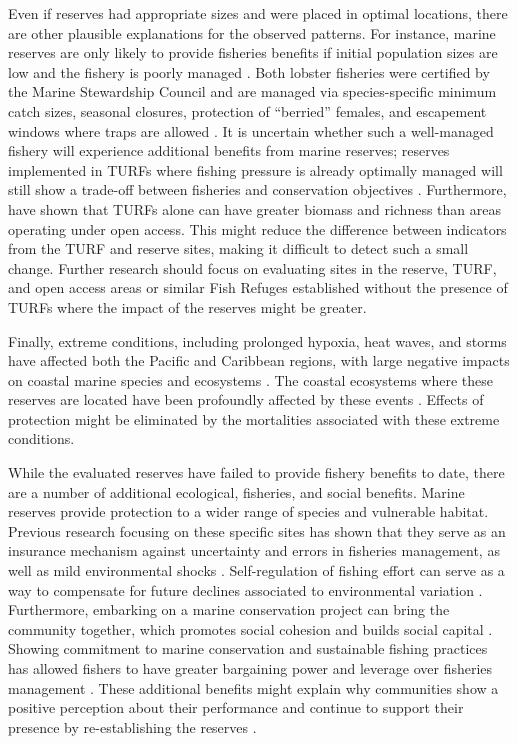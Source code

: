 \documentclass{frontiersSCNS}
\begin{document}
Even if reserves had appropriate sizes and were placed in optimal locations, there are other plausible explanations for the observed patterns. For instance, marine reserves are only likely to provide fisheries benefits if initial population sizes are low and the fishery is poorly managed \citep{hilborn_2004,hilborn_2006}. Both lobster fisheries were certified by the Marine Stewardship Council and are managed via species-specific minimum catch sizes, seasonal closures, protection of ``berried'' females, and escapement windows where traps are allowed \citep{dof_website_1993}. It is uncertain whether such a well-managed fishery will experience additional benefits from marine reserves; reserves implemented in TURFs where fishing pressure is already optimally managed will still show a trade-off between fisheries and conservation objectives \citep{lester_2017}. Furthermore, \citet{gelcich_2008} have shown that TURFs alone can have greater biomass and richness than areas operating under open access. This might reduce the difference between indicators from the TURF and reserve sites, making it difficult to detect such a small change. Further research should focus on evaluating sites in the reserve, TURF, and open access areas or similar Fish Refuges established without the presence of TURFs where the impact of the reserves might be greater.

Finally, extreme conditions, including prolonged hypoxia, heat waves, and storms have affected both the Pacific and Caribbean regions, with large negative impacts on coastal marine species and ecosystems \citep{cavole_2016,hughes_2018,breitburg_2018}. The coastal ecosystems where these reserves are located have been profoundly affected by these events \citep{micheli_2012-EU,woodson_2018}. Effects of protection might be eliminated by the mortalities associated with these extreme conditions.

While the evaluated reserves have failed to provide fishery benefits to date, there are a number of additional ecological, fisheries, and social benefits. Marine reserves provide protection to a wider range of species and vulnerable habitat. Previous research focusing on these specific sites has shown that they serve as an insurance mechanism against uncertainty and errors in fisheries management, as well as mild environmental shocks \citep{micheli_2012-EU,deleo_2015,roberts_2017-J9,aalto}. Self-regulation of fishing effort can serve as a way to compensate for future declines associated to environmental variation \citep{finkbeiner_2018}. Furthermore, embarking on a marine conservation project can bring the community together, which promotes social cohesion and builds social capital \citep{fulton_2019}. Showing commitment to marine conservation and sustainable fishing practices has allowed fishers to have greater bargaining power and leverage over fisheries management \citep{prezramrez_2012}. These additional benefits might explain why communities show a positive perception about their performance and continue to support their presence by re-establishing the reserves \citep{ayer_2018}.
\end{document}

